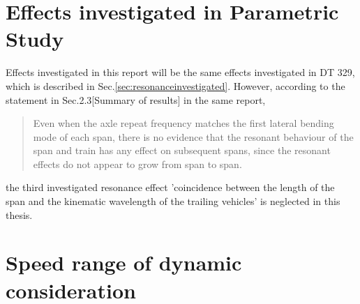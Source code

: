 



\section{Effects investigated in Parametric Study}

Effects investigated in this report will be the same effects investigated in DT 329, which is described in Sec.\ref{sec:resonanceinvestigated}. However, according to the statement in Sec.2.3[Summary of results] in the same report,

\begin{quote}
Even when the axle repeat frequency matches the first lateral bending mode of each span, there is no evidence that the resonant behaviour of the span and train has any effect on subsequent spans, since the resonant effects do not appear to grow from span to span.
\end{quote}

the third investigated resonance effect 'coincidence between the length of the span and the kinematic wavelength of the trailing vehicles' is neglected in this thesis. 


\section{Speed range of dynamic consideration}


